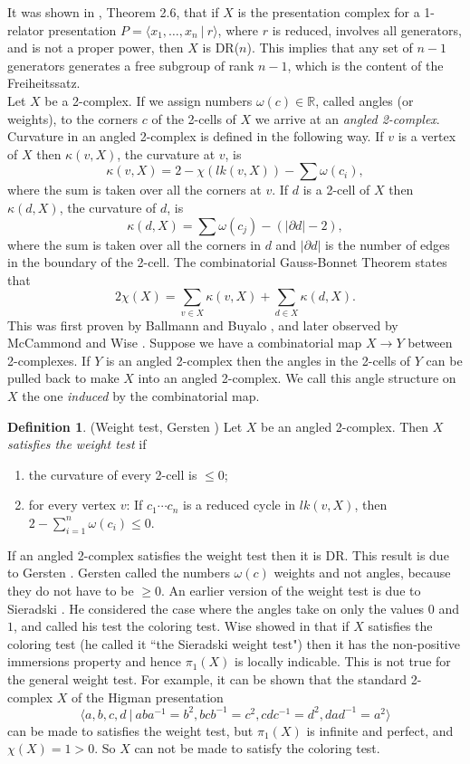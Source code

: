 \documentclass[12pt]{amsart}
\theoremstyle{definition}
\newtheorem{defn}[thm]{Definition}
\begin{document}
It was shown in \cite{HarRoseDDR}, Theorem 2.6,  that if $X$ is the presentation complex for a 1-relator presentation $P=\langle x_1,\ldots ,x_n \ |\ r\rangle$, where $r$ is reduced, involves all generators, and is not a proper power, then $X$ is DR($n$). This implies that any set of $n-1$ generators generates a free subgroup of rank $n-1$, which is the content of the Freiheitssatz.\\

Let $X$ be a 2-complex.  If we assign numbers $\omega(c)\in \mathbb R$, called angles (or weights), to the corners $c$ of the 2-cells of $X$ we arrive at an {\em angled 2-complex}. Curvature in an angled 2-complex is defined in the following way. If $v$ is a vertex of $X$ then $\kappa(v,X)$, the curvature at $v$, is
$$\kappa(v,X)=2-\chi(lk(v,X))-\sum \omega(c_i),$$ where the sum is taken over all the corners at $v$. If $d$ is a 2-cell of $X$ then $\kappa(d,X)$, the curvature of $d$, is 
$$\kappa(d,X)=\sum \omega(c_j)-(|\partial d|-2),$$ where the sum is taken over all the corners in $d$ and $|\partial d|$ is the number of edges in the boundary of the 2-cell. The combinatorial Gauss-Bonnet Theorem states that
$$2\chi(X)=\sum_{v\in X} \kappa(v,X) + \sum_{d\in X} \kappa(d,X).$$
This was first proven by Ballmann and Buyalo \cite{BallBuy}, and later observed by McCammond and Wise \cite{McCammondWise}.
Suppose we have a combinatorial map $X\to Y$ between 2-complexes. If $Y$ is an angled 2-complex then the angles in the 2-cells of $Y$ can be pulled back to make $X$ into an angled 2-complex. We call this angle structure on $X$ the one {\em induced} by the combinatorial map. 

\begin{defn}(Weight test, Gersten \cite{Ger87})
Let $X$ be an angled 2-complex. Then $X$ {\em satisfies the weight test} if 
\begin{enumerate}
    \item the curvature of every 2-cell is $\le 0$;
    \item for every vertex $v$: If $c_1\cdots c_n$ is a reduced cycle in $lk(v,X)$, then\\ $2-\sum_{i=1}^n \omega(c_i)\le 0$. 
\end{enumerate}
\end{defn}

If an angled 2-complex satisfies the weight test then it is DR. This result is due to Gersten \cite{Ger87}. Gersten called the numbers $\omega(c)$ weights and not angles, because they do not have to be $\ge 0$. An earlier version of the weight test is due to Sieradski \cite{S83}. He considered the case where the angles take on only the values $0$ and $1$, and called his test the coloring test. Wise showed in \cite{Wise04} that if $X$ satisfies the coloring test (he called it ``the Sieradski weight test") then it has the non-positive immersions property and hence $\pi_1(X)$ is locally indicable. This is not true for the general weight test. For example, it can be shown that the standard 2-complex $X$ of the Higman presentation 
$$\langle a, b, c, d\ |\ aba^{-1}=b^2, bcb^{-1}=c^2, cdc^{-1}=d^2, dad^{-1}=a^2 \rangle$$
can be made to satisfies the weight test, but $\pi_1(X)$ is infinite and perfect, and $\chi(X)=1>0$. So $X$ can not be made to satisfy the coloring test. 
\end{document}
